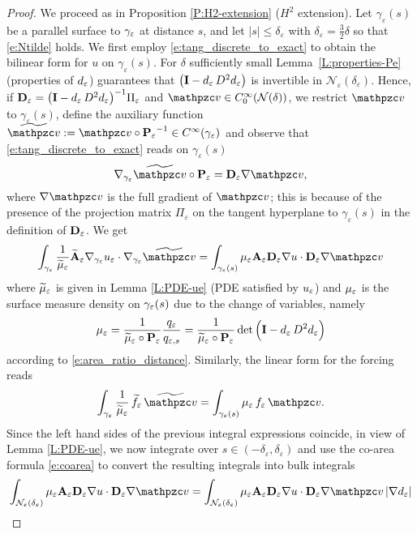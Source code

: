 \begin{proof}
We proceed as in Proposition \ref{P:H2-extension} ($H^2$ extension).
Let $\gamma_\varepsilon(s)$ be a parallel surface to ${\gamma_\varepsilon}$ at distance $s$, and let
$|s| \le {\delta_\varepsilon}$ with ${\delta_\varepsilon} = \frac{3}{2}\delta$  so that \eqref{e:Ntilde} holds.
%
We first employ \eqref{e:tang_discrete_to_exact} to obtain the bilinear form
for $u$ on $\gamma_\varepsilon(s)$. For
$\delta$ sufficiently small Lemma~\ref{L:properties-Pe} (properties of $d_\varepsilon$)
guarantees that $\big({\bf I} - d_\varepsilon \, D^2d_\varepsilon \big)$ is invertible in
${\mathcal{N}}_\varepsilon(\delta_\varepsilon)$.
Hence, if ${\mathbf{D}_\varepsilon} = \big({\bf I} - d_\varepsilon \, D^2d_\varepsilon \big)^{-1} \Pi_\varepsilon$
and $\tv \in C_0^\infty({\mathcal N(\delta)})$, we restrict $\tv$ to $\gamma_\varepsilon(s)$,
define the auxiliary function
$\ttv := \tv \circ \bPe^{-1}\in C^\infty(\gae)$ and observe that
\eqref{e:tang_discrete_to_exact} reads on $\gamma_\varepsilon(s)$
%
\[
\nabla_\gae \ttv \circ \bPe = \bDe \nabla \tv, 
\]
%
where $\nabla \tv$ is the full gradient of $\tv$; this is because of the presence
of the projection matrix $\Pi_\varepsilon$ on the tangent hyperplane to $\gamma_\varepsilon(s)$
in the definition of ${\mathbf{D}_\varepsilon}$. We get
%
\begin{align*}
\int_\gae \frac{1}{\wmue} \wbAe \nabla_\gae\ue \cdot \nabla_\gae \ttv
= \int_{\gamma_\varepsilon(s)} \mue \bAe \bDe
\nabla u \cdot \bDe \nabla \tv
\end{align*}
%
where ${\widetilde{\mu}_{\varepsilon}}$ is given in Lemma \ref{L:PDE-ue} (PDE satisfied by $u_\varepsilon$) and
${\mu_{\varepsilon}}$ is the surface measure density on ${\gamma_\varepsilon}(s)$ due to the change of variables, namely
%
\[
{\mu_{\varepsilon}} = \frac{1}{{\widetilde{\mu}_{\varepsilon}}\circ{{\bf P}_\varepsilon}} \frac{q_\varepsilon}{q_{\varepsilon,s}}
= \frac{1}{{\widetilde{\mu}_{\varepsilon}}\circ{{\bf P}_\varepsilon}} \det\Big( {\bf I} - d_\varepsilon \, D^2d_\varepsilon  \Big)
\]
%
according to \eqref{e:area_ratio_distance}.
Similarly, the linear form for the forcing reads
%
\[
\int_\gae \frac{1}{\wmue} \, \wfe \, \ttv = \int_{\gamma_\varepsilon(s)} \mue \, \fe \, \tv.
\]
%
Since the left hand sides of the previous integral expressions coincide,
in view of Lemma \ref{L:PDE-ue},
we now integrate over
$s\in(-{\delta_\varepsilon},{\delta_\varepsilon})$ and use the co-area
formula \eqref{e:coarea} to convert the resulting integrals into bulk integrals
%
\begin{align*}
  \int_{{\mathcal{N}}_\varepsilon({\delta_\varepsilon})}
  \mue \bAe \bDe \nabla u \cdot \bDe \nabla \tv
  & = \int_{{\mathcal{N}}_\varepsilon({\delta_\varepsilon})}
  \mue \bAe \bDe \nabla u \cdot \bDe \nabla \tv
\, |\nabla\wde|
\\

\end{align*}
\end{proof}
